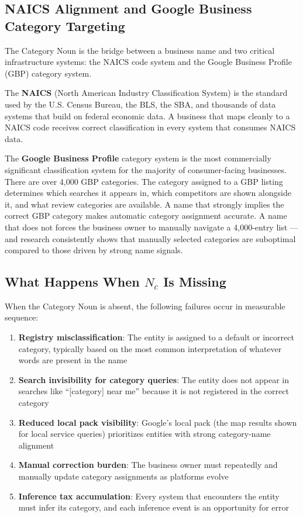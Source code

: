 \documentclass[12pt, openany]{book}
\theoremstyle{thmstyle}
\theoremstyle{defstyle}
\begin{document}
\subsection{NAICS Alignment and Google Business Category Targeting}

The Category Noun is the bridge between a business name and two critical infrastructure systems: the NAICS code system and the Google Business Profile (GBP) category system.

The \textbf{NAICS} (North American Industry Classification System) is the standard used by the U.S. Census Bureau, the BLS, the SBA, and thousands of data systems that build on federal economic data. A business that maps cleanly to a NAICS code receives correct classification in every system that consumes NAICS data.

The \textbf{Google Business Profile} category system is the most commercially significant classification system for the majority of consumer-facing businesses. There are over 4,000 GBP categories. The category assigned to a GBP listing determines which searches it appears in, which competitors are shown alongside it, and what review categories are available. A name that strongly implies the correct GBP category makes automatic category assignment accurate. A name that does not forces the business owner to manually navigate a 4,000-entry list --- and research consistently shows that manually selected categories are suboptimal compared to those driven by strong name signals.

\subsection{What Happens When $N_c$ Is Missing}

When the Category Noun is absent, the following failures occur in measurable sequence:

\begin{enumerate}[leftmargin=1.5em]
  \item \textbf{Registry misclassification}: The entity is assigned to a default or incorrect category, typically based on the most common interpretation of whatever words are present in the name
  \item \textbf{Search invisibility for category queries}: The entity does not appear in searches like ``[category] near me'' because it is not registered in the correct category
  \item \textbf{Reduced local pack visibility}: Google's local pack (the map results shown for local service queries) prioritizes entities with strong category-name alignment
  \item \textbf{Manual correction burden}: The business owner must repeatedly and manually update category assignments as platforms evolve
  \item \textbf{Inference tax accumulation}: Every system that encounters the entity must infer its category, and each inference event is an opportunity for error
\end{enumerate}
\end{document}
